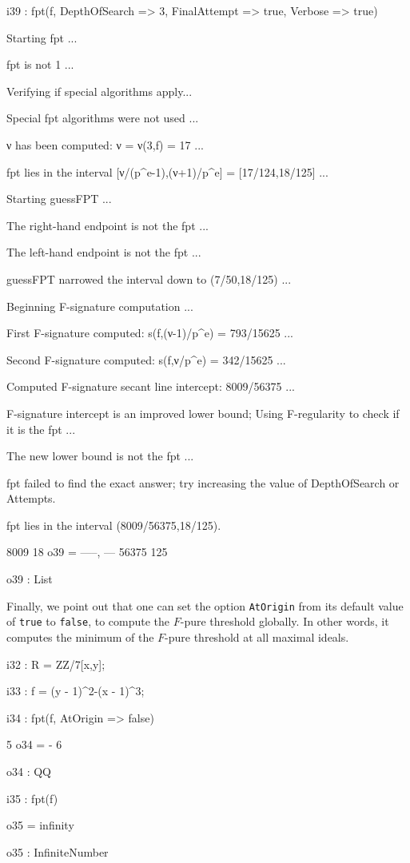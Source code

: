 \documentclass{amsart}
\begin{document}
\bigskip
{\small
{}
\begin{MyVerbatim}
i39 : fpt(f, DepthOfSearch => 3, FinalAttempt => true, Verbose => true)

Starting fpt ...

fpt is not 1 ...

Verifying if special algorithms apply...

Special fpt algorithms were not used ...

ν has been computed: ν = ν(3,f) = 17 ...

fpt lies in the interval [ν/(p^e-1),(ν+1)/p^e] = [17/124,18/125] ...

Starting guessFPT ...

The right-hand endpoint is not the fpt ...

The left-hand endpoint is not the fpt ...

guessFPT narrowed the interval down to (7/50,18/125) ...

Beginning F-signature computation ...

First F-signature computed: s(f,(ν-1)/p^e) = 793/15625 ...

Second F-signature computed: s(f,ν/p^e) = 342/15625 ...

Computed F-signature secant line intercept: 8009/56375 ...

F-signature intercept is an improved lower bound;
Using F-regularity to check if it is the fpt ...

The new lower bound is not the fpt ...

fpt failed to find the exact answer; try increasing the value of
DepthOfSearch or Attempts.

fpt lies in the interval (8009/56375,18/125).

        8009   18
o39 = {-----, ---}
       56375  125

o39 : List
\end{MyVerbatim}
}
\bigskip

Finally, we point out that one can set the option \texttt{AtOrigin} from its default value of \texttt{true} to \texttt{false}, to compute the $F$-pure threshold globally. In other words, it computes the minimum of the $F$-pure threshold at all maximal ideals.

\bigskip
{\small
{}
\begin{MyVerbatim}
i32 : R = ZZ/7[x,y];

i33 : f = (y - 1)^2-(x - 1)^3;

i34 : fpt(f, AtOrigin => false)

      5
o34 = -
      6

o34 : QQ

i35 : fpt(f)

o35 = infinity

o35 : InfiniteNumber
\end{MyVerbatim}
}
\bigskip
\end{document}
